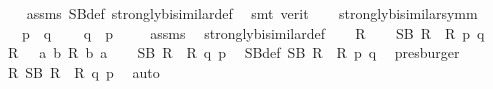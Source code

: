 \begin{isabellebody}
\ \ %
\endisadelimproof
%
\isatagproof
{}\isamarkupfalse%
\ assms\ SB{\isacharunderscore}{\kern0pt}def\ strongly{\isacharunderscore}{\kern0pt}bisimilar{\isacharunderscore}{\kern0pt}def\ \isamarkupfalse%
\ {\isacharparenleft}{\kern0pt}smt\ {\isacharparenleft}{\kern0pt}verit{\isacharparenright}{\kern0pt}{\isacharparenright}{\kern0pt}{\isacharplus}{\kern0pt}%
\endisatagproof
{\isafoldproof}%
%
\isadelimproof
\isanewline
%
\endisadelimproof
\ \ \isanewline
{}\isamarkupfalse%
\ strongly{\isacharunderscore}{\kern0pt}bisimilar{\isacharunderscore}{\kern0pt}symm{\isacharcolon}{\kern0pt}\isanewline
\ \ \ {\isacartoucheopen}p\ {\isasymleftrightarrow}\ q{\isacartoucheclose}\ \isanewline
\ \ \ {\isacartoucheopen}q\ {\isasymleftrightarrow}\ p{\isacartoucheclose}\ \isanewline
%
\isadelimproof
\ \ %
\endisadelimproof
%
\isatagproof
{}\isamarkupfalse%
\ assms\ \isamarkupfalse%
\ strongly{\isacharunderscore}{\kern0pt}bisimilar{\isacharunderscore}{\kern0pt}def\isanewline
{}\isamarkupfalse%
\isanewline
\ \ \isamarkupfalse%
\ R\isanewline
\ \ \isamarkupfalse%
\ {\isacartoucheopen}SB\ R\ {\isasymand}\ R\ p\ q{\isacartoucheclose}\isanewline
\ \ \isamarkupfalse%
\ {\isacharquery}{\kern0pt}R{\isacharprime}{\kern0pt}\ {\isacharequal}{\kern0pt}\ {\isacartoucheopen}{\isasymlambda}\ a\ b{\isachardot}{\kern0pt}\ R\ b\ a{\isacartoucheclose}\isanewline
\ \ \isamarkupfalse%
\ {\isacartoucheopen}SB\ {\isacharquery}{\kern0pt}R{\isacharprime}{\kern0pt}\ {\isasymand}\ {\isacharquery}{\kern0pt}R{\isacharprime}{\kern0pt}\ q\ p{\isacartoucheclose}\ \isamarkupfalse%
\ SB{\isacharunderscore}{\kern0pt}def\ {\isacartoucheopen}SB\ R\ {\isasymand}\ R\ p\ q{\isacartoucheclose}\ \isamarkupfalse%
\ presburger\isanewline
\ \ \isamarkupfalse%
\ {\isacartoucheopen}{\isasymexists}R{\isachardot}{\kern0pt}\ SB\ R\ {\isasymand}\ R\ q\ p{\isacartoucheclose}\ \isamarkupfalse%
\ auto\isanewline
{}\isamarkupfalse%
%
\endisatagproof
{\isafoldproof}%
%
\isadelimproof
\isanewline
%
\endisadelimproof
\isanewline
{}\isamarkupfalse%
\ %
%
\isadelimtheory
%
\endisadelimtheory
%
\isatagtheory
%
\endisatagtheory
{\isafoldtheory}%
%
\isadelimtheory
%
\endisadelimtheory
%
\end{isabellebody}%
\endinput

